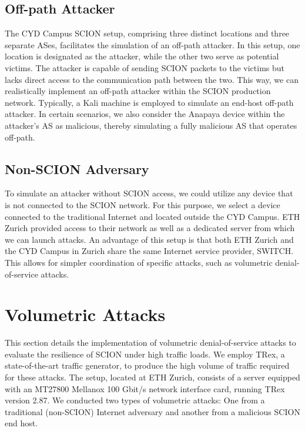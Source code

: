 \subsection{Off-path Attacker}

The CYD Campus SCION setup, comprising three distinct locations and three separate ASes, facilitates the simulation of an off-path attacker.
In this setup, one location is designated as the attacker, while the other two serve as potential victims.
The attacker is capable of sending SCION packets to the victims but lacks direct access to the communication path between the two.
This way, we can realistically implement an off-path attacker within the SCION production network.
Typically, a Kali machine is employed to simulate an end-host off-path attacker.
In certain scenarios, we also consider the Anapaya device within the attacker's AS as malicious, thereby simulating a fully malicious AS that operates off-path.

\subsection{Non-SCION Adversary}
To simulate an attacker without SCION access, we could utilize any device that is not connected to the SCION network.
For this purpose, we select a device connected to the traditional Internet and located outside the CYD Campus.
ETH Zurich provided access to their network as well as a dedicated server from which we can launch attacks.
An advantage of this setup is that both ETH Zurich and the CYD Campus in Zurich share the same Internet service provider, SWITCH.
This allows for simpler coordination of specific attacks, such as volumetric denial-of-service attacks.

\newpage
\section{Volumetric Attacks}
\label{sec:impl:VolumetricDoS}
This section details the implementation of volumetric denial-of-service attacks to evaluate the resilience of SCION under high traffic loads.
We employ TRex, a state-of-the-art traffic generator, to produce the high volume of traffic required for these attacks.
The setup, located at ETH Zurich, consists of a server equipped with an MT27800 Mellanox 100 Gbit/s network interface card, running TRex version 2.87.
We conducted two types of volumetric attacks:
One from a traditional (non-SCION) Internet adversary and another from a malicious SCION end host.

